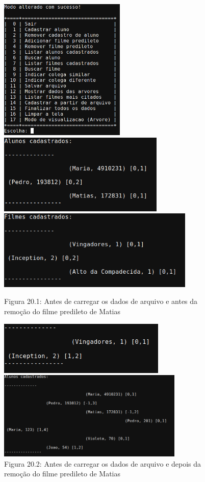 \documentclass[12pt,a4paper,portuguese]{article}
\begin{document}
        \begin{figure}[H]
            \centering
            \includegraphics[width=6cm]{imgs/modo_de_visualizacao_1.png}\\
            \includegraphics[height=3.8cm]{imgs/lista_alunos_ARVORE_1.png}
            \includegraphics[height=3.8cm]{imgs/lista_filmes_ARVORE_1.png}
            \vspace{-10px}
            \caption*{Figura 20.1: Antes de carregar os dados de arquivo e antes da remoção do filme predileto de Matias}
            \includegraphics[width=8cm]{imgs/lista_filmes_ARVORE_2.png}
            \vspace{-10px}
            \caption*{Figura 20.2: Antes de carregar os dados de arquivo e depois da remoção do filme predileto de Matias}
            \includegraphics[height=4.2cm]{imgs/lista_alunos_ARVORE_2.png}

\end{figure}
\end{document}
